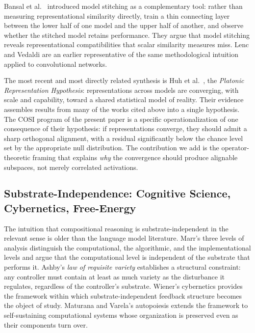 Bansal et al.~\cite{bansal2021revisiting} introduced model stitching as
a complementary tool: rather than measuring representational similarity
directly, train a thin connecting layer between the lower half of one
model and the upper half of another, and observe whether the stitched
model retains performance. They argue that model stitching reveals
representational compatibilities that scalar similarity measures miss.
Lenc and Vedaldi \cite{lenc2015understanding} are an earlier
representative of the same methodological intuition applied to
convolutional networks.

The most recent and most directly related synthesis is Huh et
al.~\cite{huh2024platonic}, the \emph{Platonic Representation
Hypothesis}: representations across models are converging, with scale
and capability, toward a shared statistical model of reality. Their
evidence assembles results from many of the works cited above into a
single hypothesis. The COSI program of the present paper is a specific
operationalization of one consequence of their hypothesis: if
representations converge, they should admit a sharp orthogonal
alignment, with a residual significantly below the chance level set by
the appropriate null distribution. The contribution we add is the
operator-theoretic framing that explains \emph{why} the convergence
should produce alignable subspaces, not merely correlated activations.

\subsection{Substrate-Independence: Cognitive Science, Cybernetics, Free-Energy}

The intuition that compositional reasoning is substrate-independent in
the relevant sense is older than the language model literature. Marr's
three levels of analysis \cite{marr1982vision} distinguish the
computational, the algorithmic, and the implementational levels and
argue that the computational level is independent of the substrate
that performs it. Ashby's \emph{law of requisite variety}
\cite{ashby1956introduction} establishes a structural constraint:
any controller must contain at least as much variety as the disturbance
it regulates, regardless of the controller's substrate. Wiener's
cybernetics \cite{wiener1948cybernetics} provides the framework within
which substrate-independent feedback structure becomes the object of
study. Maturana and Varela's autopoiesis
\cite{maturana1980autopoiesis} extends the framework to
self-sustaining computational systems whose organization is preserved
even as their components turn over.

